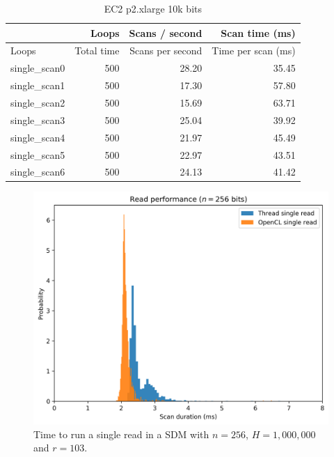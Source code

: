 \begin{table}[!htb]
\centering
\begin{tabular}{| l | r | r | r |}
    \hline
    & Loops & Scans / second & Scan time (ms) \\ \hline
    Loops & Total time & Scans per second & Time per scan (ms) \\
    single\_scan0 & 500 & 28.20 & 35.45 \\
    single\_scan1 & 500 & 17.30 & 57.80 \\
    single\_scan2 & 500 & 15.69 & 63.71 \\
    single\_scan3 & 500 & 25.04 & 39.92 \\
    single\_scan4 & 500 & 21.97 & 45.49 \\
    single\_scan5 & 500 & 22.97 & 43.51 \\
    single\_scan6 & 500 & 24.13 & 41.42 \\
    \hline
\end{tabular}
\caption{EC2 p2.xlarge 10k bits
\label{tab:perf-imac-256}}
\end{table}

\begin{figure}[!htb]
\centering\includegraphics[width=\textwidth]{images02/performance/imac-read-256.png}
\caption{Time to run a single read in a SDM with $n=256$, $H=1,000,000$ and $r=103$.
\label{fig:perf-imac-read-256}}
\end{figure}

